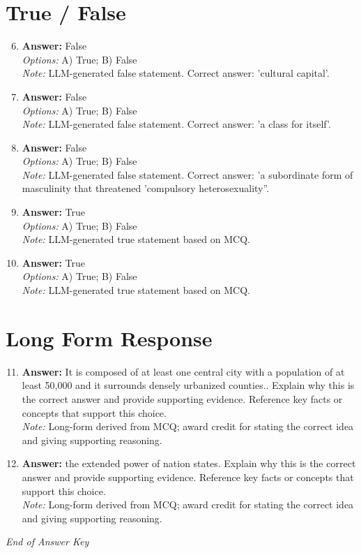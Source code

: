 \documentclass[12pt]{article}
\begin{document}
\section*{True / False}
\begin{enumerate}[label=\arabic*.]
\setcounter{enumi}{5}
\item \textbf{Answer:} False
\\ \textit{Options:} A) True; B) False
\\ \textit{Note:} LLM-generated false statement. Correct answer: 'cultural capital'.
\item \textbf{Answer:} False
\\ \textit{Options:} A) True; B) False
\\ \textit{Note:} LLM-generated false statement. Correct answer: 'a class for itself'.
\item \textbf{Answer:} False
\\ \textit{Options:} A) True; B) False
\\ \textit{Note:} LLM-generated false statement. Correct answer: 'a subordinate form of masculinity that threatened 'compulsory heterosexuality''.
\item \textbf{Answer:} True
\\ \textit{Options:} A) True; B) False
\\ \textit{Note:} LLM-generated true statement based on MCQ.
\item \textbf{Answer:} True
\\ \textit{Options:} A) True; B) False
\\ \textit{Note:} LLM-generated true statement based on MCQ.
\end{enumerate}

\section*{Long Form Response}
\begin{enumerate}[label=\arabic*.]
\setcounter{enumi}{10}
\item \textbf{Answer:} It is composed of at least one central city with a population of at least 50,000 and it surrounds densely urbanized counties.. Explain why this is the correct answer and provide supporting evidence. Reference key facts or concepts that support this choice.
\\ \textit{Note:} Long-form derived from MCQ; award credit for stating the correct idea and giving supporting reasoning.
\item \textbf{Answer:} the extended power of nation states. Explain why this is the correct answer and provide supporting evidence. Reference key facts or concepts that support this choice.
\\ \textit{Note:} Long-form derived from MCQ; award credit for stating the correct idea and giving supporting reasoning.
\end{enumerate}

\vfill
\noindent\textit{End of Answer Key}
\end{document}
